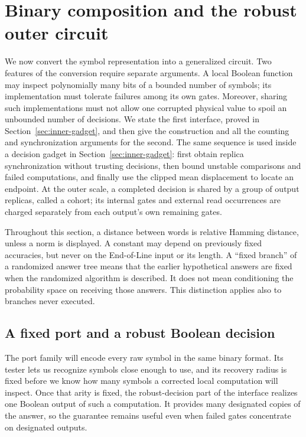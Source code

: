 \section{Binary composition and the robust outer circuit}\label{sec:outer-composition}

We now convert the symbol representation into a generalized circuit. Two
features of the conversion require separate arguments. A local Boolean
function may inspect polynomially many bits of a bounded number of symbols;
its implementation must tolerate failures among its own gates. Moreover,
sharing such implementations must not allow one corrupted physical value
to spoil an unbounded number of decisions. We state the first interface,
proved in Section~\ref{sec:inner-gadget}, and then give the construction and
all the counting and synchronization arguments for the second.
The same sequence is used inside a decision gadget in
Section~\ref{sec:inner-gadget}: first obtain replica synchronization without
trusting decisions, then bound unstable comparisons and failed computations,
and finally use the clipped mean displacement to locate an endpoint.
At the outer scale, a completed decision is shared by a group of output
replicas, called a cohort; its internal gates and external read occurrences are charged separately from
each output's own remaining gates.

Throughout this section, a distance between words is relative Hamming
distance, unless a norm is displayed. A constant may depend on previously
fixed accuracies, but never on the End-of-Line input or its length. A
``fixed branch'' of a randomized answer tree means that the earlier
hypothetical answers are fixed when the randomized algorithm is described.
It does not mean conditioning the probability space on receiving those
answers. This distinction applies also to branches never executed.

\subsection{A fixed port and a robust Boolean decision}

The port family will encode every raw symbol in the same binary format.
Its tester lets us recognize symbols close enough to use, and its recovery
radius is fixed before we know how many symbols a corrected local
computation will inspect. Once that arity is fixed, the robust-decision part of
the interface realizes one Boolean output of such a computation. It
provides many designated copies of the answer, so the guarantee remains
useful even when failed gates concentrate on designated outputs.

